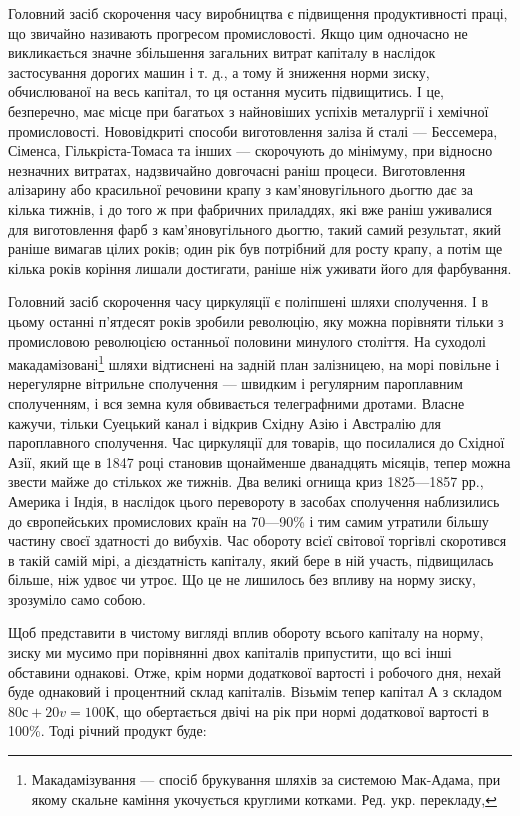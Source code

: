 Головний засіб скорочення часу виробництва є підвищення
продуктивності праці, що звичайно називають прогресом промисловості.
Якщо цим одночасно не викликається значне збільшення
загальних витрат капіталу в наслідок застосування дорогих
машин і т. д., а тому й зниження норми зиску, обчислюваної
на весь капітал, то ця остання мусить підвищитись. І це, безперечно,
має місце при багатьох з найновіших успіхів металургії
і хемічної промисловості. Нововідкриті способи виготовлення
заліза й сталі — Бессемера, Сіменса, Гількріста-Томаса та інших —
скорочують до мінімуму, при відносно незначних витратах,
надзвичайно довгочасні раніш процеси. Виготовлення алізарину
або красильної речовини крапу з кам’яновугільного дьогтю дає
за кілька тижнів, і до того ж при фабричних приладдях, які
вже раніш уживалися для виготовлення фарб з кам’яновугільного
дьогтю, такий самий результат, який раніше вимагав цілих
років; один рік був потрібний для росту крапу, а потім ще
кілька років коріння лишали достигати, раніше ніж уживати
його для фарбування.

Головний засіб скорочення часу циркуляції є поліпшені
шляхи сполучення. І в цьому останні п’ятдесят років зробили
революцію, яку можна порівняти тільки з промисловою революцією
останньої половини минулого століття. На суходолі макадамізовані\footnote*{
Макадамізування — спосіб брукування шляхів за системою Мак-Адама,
при якому скальне каміння укочується круглими котками. Ред. укр. перекладу,
} шляхи відтиснені на задній план залізницею, на
морі повільне і нерегулярне вітрильне сполучення — швидким
і регулярним пароплавним сполученням, і вся земна куля обвивається
телеграфними дротами. Власне кажучи, тільки Суецький
канал і відкрив Східну Азію і Австралію для пароплавного сполучення.
Час циркуляції для товарів, що посилалися до Східної
Азії, який ще в 1847 році становив щонайменше дванадцять
місяців, тепер можна звести майже
до стількох же тижнів. Два великі огнища криз 1825—1857 рр.,
Америка і Індія, в наслідок цього перевороту в засобах сполучення
наблизились до європейських промислових країн на
70—90\% і тим самим утратили більшу частину своєї здатності
до вибухів. Час обороту всієї світової торгівлі скоротився
в такій самій мірі, а дієздатність капіталу, який бере в ній
участь, підвищилась більше, ніж удвоє чи утроє. Що це не
лишилось без впливу на норму зиску, зрозуміло само собою.

Щоб представити в чистому вигляді вплив обороту всього
капіталу на норму, зиску ми мусимо при порівнянні двох
капіталів припустити, що всі інші обставини однакові. Отже,
крім норми додаткової вартості і робочого дня, нехай буде
однаковий і процентний склад капіталів. Візьмім тепер капітал
$А$ з складом $80с + 20v = 100К$, що обертається двічі на рік
при нормі додаткової вартості в 100\%. Тоді річний продукт
буде:

